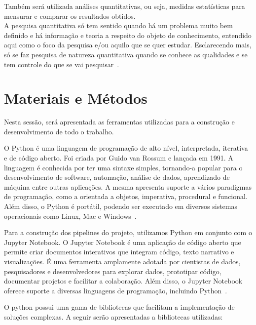 Também será utilizada análises quantitativas, ou seja, medidas estatísticas para mensurar e comparar os resultados obtidos.\\
A pesquisa quantitativa só tem sentido quando há um problema muito bem definido e há informação e teoria a respeito do objeto de conhecimento, entendido aqui como o foco da pesquisa e/ou aquilo que se quer estudar. Esclarecendo mais, só se faz pesquisa de natureza quantitativa quando se conhece as qualidades e se tem controle do que se vai pesquisar~\cite{da_silva_pesquisa_2014}.

\section{Materiais e Métodos}
Nesta sessão, será apresentada as ferramentas utilizadas para a construção e desenvolvimento de todo o trabalho.

O Python é uma linguagem de programação de alto nível, interpretada, iterativa e de código aberto. Foi criada por Guido van Rossum e lançada em 1991. A linguagem é conhecida por ter uma sintaxe simples, tornando-a popular para o desenvolvimento de software, automação, análise de dados, aprendizado de máquina entre outras aplicações. A mesma apresenta suporte a vários paradigmas de programação, como a orientada a objetos, imperativa, procedural e funcional. Além disso, o Python é portátil, podendo ser executado em diversos sistemas operacionais como Linux, Mac e Windows~\cite{python-reference}.

Para a construção dos pipelines do projeto, utilizamos Python em conjunto com o Jupyter Notebook. O Jupyter Notebook é uma aplicação de código aberto que permite criar documentos interativos que integram código, texto narrativo e visualizações. É uma ferramenta amplamente adotada por cientistas de dados, pesquisadores e desenvolvedores para explorar dados, prototipar código, documentar projetos e facilitar a colaboração. Além disso, o Jupyter Notebook oferece suporte a diversas linguagens de programação, incluindo Python~\cite{jupyter-notebook}.

O python possui uma gama de bibliotecas que facilitam a implementação de soluções complexas. A seguir serão apresentadas a bibliotecas utilizadas:

